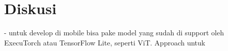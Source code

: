 \section{Diskusi}
\label{sec:diskusi}
- untuk develop di mobile bisa pake model yang sudah di support oleh ExecuTorch atau TensorFlow Lite, seperti ViT. Approach untuk 